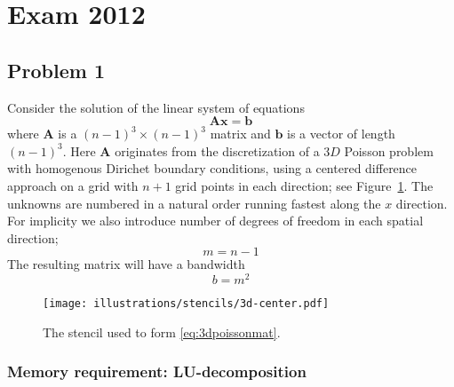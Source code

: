 
\section{Exam 2012} %
\label{sec:exam_2012}

\subsection{Problem 1} %
\label{sub:problem_1}


\begin{question}
  Consider the solution of the linear system of equations
  \begin{equation}
    \mathbf{Ax} = \mathbf{b} \label{eq:3dpoissonmat}
  \end{equation}
  where $\mathbf{A}$ is a $(n-1)^3 \times (n-1)^3$ matrix and $\mathbf{b}$ is a vector of length $(n-1)^3$. Here $\mathbf{A}$ originates from the discretization of a $3D$ Poisson problem with homogenous Dirichet boundary conditions, using a centered difference approach on a grid with $n+1$ grid points in each direction; see Figure~\ref{fig:3d-stencil}. The unknowns are numbered in a natural order running fastest along the $x$ direction. For implicity we also introduce number of degrees of freedom in each spatial direction;
  \begin{equation}
    m = n-1 \label{eq:3dpoisson_degrees_of_freedom}
  \end{equation}
  The resulting matrix will have a bandwidth
  \begin{equation}
    b = m^2 \label{eq:3dpoisson_bandwidth}
  \end{equation}

  \begin{figure}[H]
    \centering
    \texttt{[image: illustrations/stencils/3d-center.pdf]}
    \caption{The stencil used to form \eqref{eq:3dpoissonmat}.}
    \label{fig:3d-stencil}
  \end{figure}
\end{question}


\subsubsection{Memory requirement: LU-decomposition} %
\label{ssub:memory_requirement_lu_decomposition}


